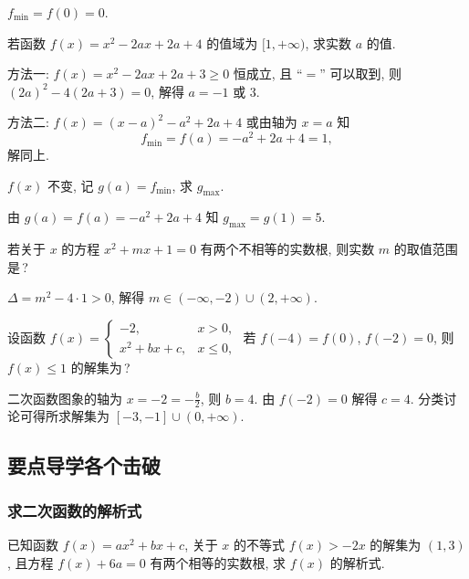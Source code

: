   \beginsolution
    $f_{\min}=f(0)=0$.
  \endsolution
  
  \begin{exercise}
    若函数 $f(x)=x^2 -2ax+2a+4$ 的值域为 $[1,+\infty)$,
    求实数 $a$ 的值.
  \end{exercise}

  \beginsolution
    方法一: $f(x)=x^2 -2ax+2a+3\geqslant 0$ 恒成立, 且 ``$=$'' 可以取到, 则 $(2a)^2-4(2a+3)=0$, 解得 $a=-1$ 或 $3$.
    
    方法二: $f(x)=(x-a)^2-a^2+2a+4$ 或由轴为 $x=a$ 知
    \[f_{\min}=f(a)=-a^2+2a+4=1,\]
    解同上.
    
    \varexercise $f(x)$ 不变, 记 $g(a)=f_{\min}$, 求 $g_{\max}$.
    
    由 $g(a)=f(a)=-a^2+2a+4$ 知 $g_{\max}=g(1)=5$.
  \endsolution
  
  \begin{exercise}
    若关于 $x$ 的方程 $x^2 +mx+1=0$ 有两个不相等的实数根, 
    则实数 $m$ 的取值范围是\,?
  \end{exercise}

  \beginsolution
    $\Delta=m^2-4\cdot1>0$, 解得 $m\in(-\infty,-2)\cup(2,+\infty)$.
  \endsolution
  
  \begin{exercise}
    设函数 $f(x)=\begin{cases}  
      -2, & x>0,\\
      x^2+bx+c, & x\leqslant 0,
    \end{cases}$ 若 $f(-4)=f(0)$, $f(-2)=0$, 
    则 $f(x)\leqslant 1$ 的解集为\,?
  \end{exercise}

  \beginsolution
    二次函数图象的轴为 $x=-2=-\frac{b}2$, 则 $b=4$. 由 $f(-2)=0$ 解得 $c=4$. 分类讨论可得所求解集为 $[-3,-1]\cup(0,+\infty)$.
  \endsolution
  
  \subsection{要点导学\quad 各个击破}
  \subsubsection{求二次函数的解析式}
  \begin{example}
    已知函数 $f(x)=ax^2+bx+c$, 关于 $x$ 的不等式 $f(x)>-2x$ 的解集为 $(1,3)$, 
    且方程 $f(x)+6a=0$ 有两个相等的实数根, 求 $f(x)$ 的解析式.
  \end{example}

